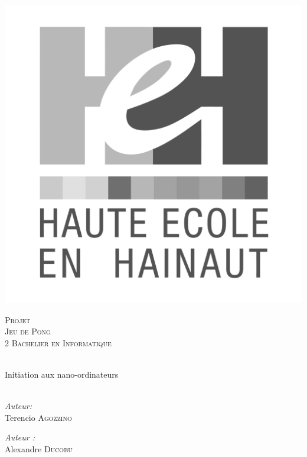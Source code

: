 \begin{center}
  \includegraphics[scale=0.12]{textures/logo/heh_bw.pdf}

  \vspace{1cm}

  \textsc{\LARGE Projet} \\ [0.5cm]
  \textsc{\Large Jeu de Pong} \\ [0.5cm]

  \textsc{\large 2 Bachelier en Informatique} \\ [0.2cm]

  \begingroup
   \selectfont 

  \HRule \\ [0.4cm] {
    \huge Initiation aux nano-ordinateurs \\ [0.2cm] 
  }
  \HRule \\ [1.3cm]
  \endgroup

  \begin{minipage}[t]{0.4 \textwidth} 
    \begin{flushleft} 
      \large \emph{Auteur:} \\ 
      Terencio \textsc{Agozzino}
    \end{flushleft} 
  \end{minipage}
  \begin{minipage}[t]{0.4 \textwidth}
    \begin{flushright} 
      \large \emph{Auteur :} \\ 
      Alexandre \textsc{Ducobu}
    \end{flushright} 
  \end{minipage}


\end{center}
